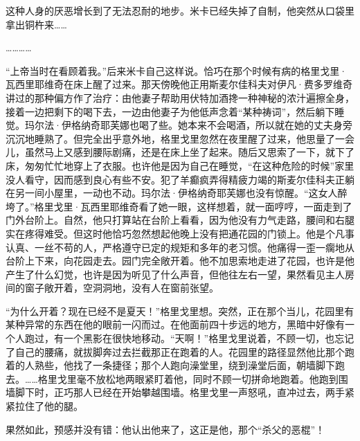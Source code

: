 \par 这种人身的厌恶增长到了无法忍耐的地步。米卡已经失掉了自制，他突然从口袋里拿出铜杵来……
\par …………
\par “上帝当时在看顾着我。”后来米卡自己这样说。恰巧在那个时候有病的格里戈里·瓦西里耶维奇在床上醒了过来。那天傍晚他正用斯麦尔佳科夫对伊凡·费多罗维奇讲过的那种偏方作了治疗：由他妻子帮助用伏特加酒搀一种神秘的浓汁遍擦全身，接着一边把剩下的喝下去，一边由他妻子为他低声念着“某种祷词”，然后躺下睡觉。玛尔法·伊格纳奇耶芙娜也喝了些。她本来不会喝酒，所以就在她的丈夫身旁沉沉地睡熟了。但完全出乎意外地，格里戈里忽然在夜里醒了过来，他思量了一会儿，虽然马上又感到腰际剧痛，还是在床上坐了起来。随后又思索了一下，就下了床，匆匆忙忙地穿上了衣服。也许他是因为自己在睡觉，“在这种危险的时候”家里没人看守，因而感到良心有些不安。犯了羊癫疯弄得精疲力竭的斯麦尔佳科夫正躺在另一间小屋里，一动也不动。玛尔法·伊格纳奇耶芙娜也没有惊醒。“这女人醉垮了。”格里戈里·瓦西里耶维奇看了她一眼，这样想着，就一面哼哼，一面走到了门外台阶上。自然，他只打算站在台阶上看看，因为他没有力气走路，腰间和右腿实在疼得难受。但这时他恰巧忽然想起他晚上没有把通花园的门锁上。他是个凡事认真、一丝不苟的人，严格遵守已定的规矩和多年的老习惯。他痛得一歪一瘸地从台阶上下来，向花园走去。园门完全敞开着。他不加思索地走进了花园，也许是他产生了什么幻觉，也许是因为听见了什么声音，但他往左右一望，果然看见主人房间的窗子敞开着，空洞洞地，没有人在窗前张望。
\par “为什么开着？现在已经不是夏天！”格里戈里想。突然，正在那个当儿，花园里有某种异常的东西在他的眼前一闪而过。在他面前四十步远的地方，黑暗中好像有一个人跑过，有一个黑影在很快地移动。“天啊！”格里戈里说着，不顾一切，也忘记了自己的腰痛，就拔脚奔过去拦截那正在跑着的人。花园里的路径显然他比那个跑着的人熟些，他找了一条捷径；那个人跑向澡堂里，绕到澡堂后面，朝墙脚下跑去。……格里戈里毫不放松地两眼紧盯着他，同时不顾一切拼命地跑着。他跑到围墙脚下时，正巧那人已经在开始攀越围墙。格里戈里一声怒吼，直冲过去，两手紧紧拉住了他的腿。
\par 果然如此，预感并没有错：他认出他来了，这正是他，那个“杀父的恶棍”！
